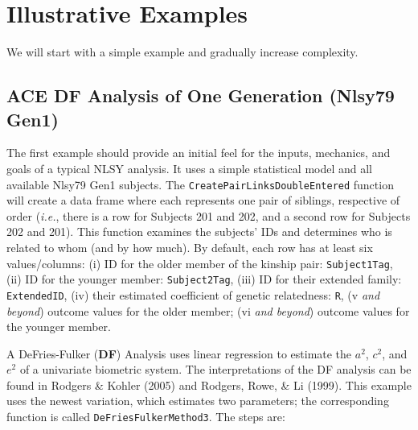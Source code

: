 \documentclass[smallextended]{svjour3}       %
\begin{document}
\hypertarget{illustrative-examples}{%
\section{Illustrative Examples}\label{illustrative-examples}}

We will start with a simple example and gradually increase complexity.

\hypertarget{ace-df-analysis-of-one-generation-nlsy79-gen1}{%
\subsection{ACE DF Analysis of One Generation (Nlsy79
Gen1)}\label{ace-df-analysis-of-one-generation-nlsy79-gen1}}

The first example should provide an initial feel for the inputs,
mechanics, and goals of a typical NLSY analysis. It uses a simple
statistical model and all available Nlsy79 Gen1 subjects. The
\texttt{CreatePairLinksDoubleEntered} function will create a data frame
where each represents one pair of siblings, respective of order
(\emph{i.e.}, there is a row for Subjects 201 and 202, and a second row
for Subjects 202 and 201). This function examines the subjects' IDs and
determines who is related to whom (and by how much). By default, each
row has at least six values/columns: (i) ID for the older member of the
kinship pair: \texttt{Subject1Tag}, (ii) ID for the younger member:
\texttt{Subject2Tag}, (iii) ID for their extended family:
\texttt{ExtendedID}, (iv) their estimated coefficient of genetic
relatedness: \texttt{R}, (v \emph{and beyond}) outcome values for the
older member; (vi \emph{and beyond}) outcome values for the younger
member.

A DeFries-Fulker (\textbf{DF}) Analysis uses linear regression to
estimate the \(a^2\), \(c^2\), and \(e^2\) of a univariate biometric
system. The interpretations of the DF analysis can be found in Rodgers
\& Kohler (2005) and Rodgers, Rowe, \& Li (1999). This example uses the
newest variation, which estimates two parameters; the corresponding
function is called \texttt{DeFriesFulkerMethod3}. The steps are:
\end{document}
